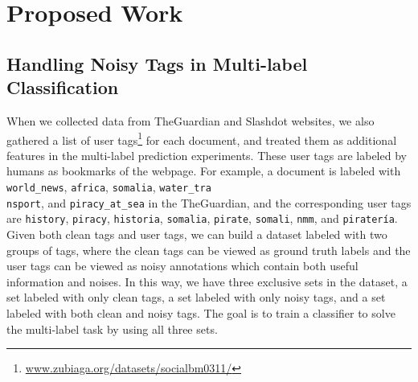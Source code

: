 \section{Proposed Work}


    
\subsection{Handling Noisy Tags in Multi-label Classification}  \label{future_noise}

When we collected data from TheGuardian and Slashdot websites, we also gathered a list of user tags\footnote{\scriptsize\url{www.zubiaga.org/datasets/socialbm0311/}} for each document, and treated them as additional features in the multi-label prediction experiments. These user tags are labeled by humans as bookmarks of the webpage. For example, a document is labeled with \texttt{world\_news}, \texttt{africa}, \texttt{somalia}, \texttt{water\_tra\\nsport}, and \texttt{piracy\_at\_sea} in the TheGuardian, and the corresponding user tags are \texttt{history}, \texttt{piracy}, \texttt{historia}, \texttt{somalia}, \texttt{pirate}, \texttt{somali}, \texttt{nmm}, and \texttt{piratería}. Given both clean tags and user tags, we can build a dataset labeled with two groups of tags, where the clean tags can be viewed as ground truth labels and the user tags can be viewed as noisy annotations which contain both useful information and noises. In this way, we have three exclusive sets in the dataset, a set labeled with only clean tags, a set labeled with only noisy tags, and a set labeled with both clean and noisy tags. The goal is to train a classifier to solve the multi-label task by using all three sets.

